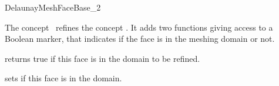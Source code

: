 \begin{ccRefConcept}{DelaunayMeshFaceBase_2}

\ccDefinition

The concept \ccRefName\ refines the concept
  . It adds two functions giving access
  to a Boolean marker, that indicates if the face is in the
  meshing domain or not.

\ccRefines
{}


\ccAccessFunctions

{ returns true if this face is in the domain to be refined.}

{ sets if this face is in the domain. }

\ccHasModels
{}

\end{ccRefConcept}

